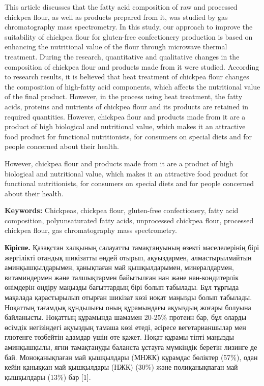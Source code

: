 This article discusses that the fatty acid composition of raw and
processed chickpea flour, as well as products prepared from it, was
studied by gas chromatography mass spectrometry. In this study, our
approach to improve the suitability of chickpea flour for gluten-free
confectionery production is based on enhancing the nutritional value of
the flour through microwave thermal treatment. During the research,
quantitative and qualitative changes in the composition of chickpea
flour and products made from it were studied. According to research
results, it is believed that heat treatment of chickpea flour changes
the composition of high-fatty acid components, which affects the
nutritional value of the final product. However, in the process using
heat treatment, the fatty acids, proteins and nutrients of chickpea
flour and its products are retained in required quantities. However,
chickpea flour and products made from it are a product of high
biological and nutritional value, which makes it an attractive food
product for functional nutritionists, for consumers on special diets and
for people concerned about their health.

However, chickpea flour and products made from it are a product of high
biological and nutritional value, which makes it an attractive food
product for functional nutritionists, for consumers on special diets and
for people concerned about their health.

{\bfseries Keywords:} Chickpeas, chickpea flour, gluten-free confectionery,
fatty acid composition, polyunsaturated fatty acids, unprocessed
chickpea flour, processed chickpea flour, gas chromatography mass
spectrometry.

{\bfseries Кіріспе.} Қазақстан халқының салауатты тамақтануының өзекті
мәселелерінің бірі жергілікті отандық шикізатты өңдей отырып,
ақуыздармен, алмастырылмайтын аминқышқылдарымен, қанықпаған май
қышқылдарымен, минералдармен, витаминдермен және талшықтармен байытылған
нан және нан-кондитерлік өнімдерін өндіру маңызды бағыттардың бірі болып
табылады. Бұл тұрғыда мақалада қарастырылып отырған шикізат көзі ноқат
маңызды болып табылады. Ноқаттың тағамдық құндылығы оның құрамындағы
ақуыздың жоғары болуына байланысты. Ноқаттың құрамында шамамен 20-25\%
протеин бар, бұл оларды өсімдік негізіндегі ақуыздың тамаша көзі етеді,
әсіресе вегетарианшылар мен глютенге төзбейтін адамдар үшін өте қажет.
Ноқат құрамы тіпті маңызды аминқышқылы, яғни тамақтануды баланста
ұстауға мүмкіндік беретін лизинге де бай. Моноқанықпаған май қышқылдары
(МНЖК) құрамдас бөліктер (57\%), одан кейін қаныққан май қышқылдары
(НЖК) (30\%) және полиқанықпаған май қышқылдары (13\%) бар {[}1{]}.

